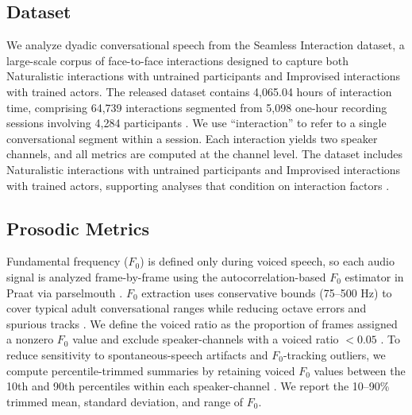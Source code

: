 \documentclass{Interspeech}
\begin{document}
\subsection{Dataset}
We analyze dyadic conversational speech from the Seamless Interaction dataset, a large-scale corpus of face-to-face interactions designed to capture both Naturalistic interactions with untrained participants and Improvised interactions with trained actors. 
The released dataset contains 4,065.04 hours of interaction time, comprising 64,739 interactions segmented from 5,098 one-hour recording sessions involving 4,284 participants \cite{seamless_interaction}. 
We use ``interaction'' to refer to a single conversational segment within a session. 
Each interaction yields two speaker channels, and all metrics are computed at the channel level. 
The dataset includes Naturalistic interactions with untrained participants and Improvised interactions with trained actors, supporting analyses that condition on interaction factors \cite{fusaroli_dialog_2014, wynn_conversational_2024}.

\subsection{Prosodic Metrics}
Fundamental frequency ($F_0$) is defined only during voiced speech, so each audio signal is analyzed frame-by-frame using the autocorrelation-based $F_0$ estimator in Praat via parselmouth \cite{jadoul2018introducing}. 
$F_0$ extraction uses conservative bounds (75--500 Hz) to cover typical adult conversational ranges while reducing octave errors and spurious tracks \cite{vogel2009standardization}. 
We define the voiced ratio as the proportion of frames assigned a nonzero $F_0$ value and exclude speaker-channels with a voiced ratio $<0.05$ \cite{titze_toward_1994}. 
To reduce sensitivity to spontaneous-speech artifacts and $F_0$-tracking outliers, we compute percentile-trimmed summaries by retaining voiced $F_0$ values between the 10th and 90th percentiles within each speaker-channel \cite{nguyen2024culturax}. 
We report the 10--90\% trimmed mean, standard deviation, and range of $F_0$.
\end{document}
